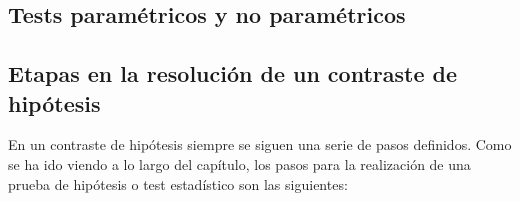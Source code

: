 
\subsection{Tests paramétricos y no paramétricos}


\subsection{Etapas en la resolución de un contraste de hipótesis}
En un contraste de hipótesis siempre se siguen una serie de pasos definidos. Como se ha ido viendo a lo largo
del capítulo, los pasos para la realización de una prueba de hipótesis o test estadístico son las siguientes:
